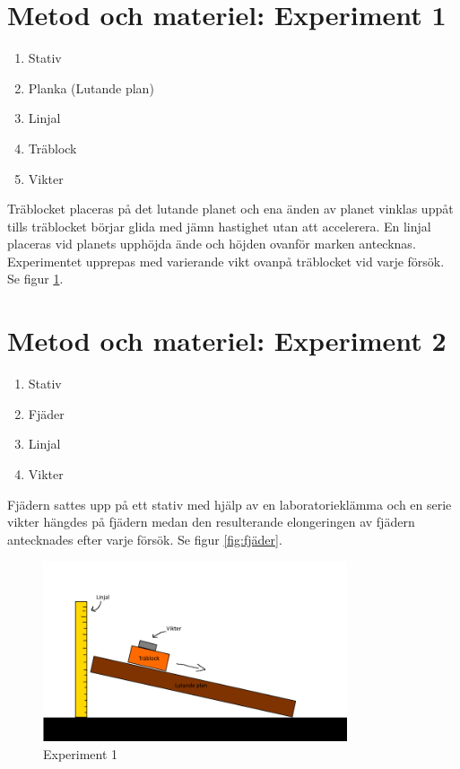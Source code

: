 \documentclass[11p, titlepage, oneside, a4paper]{article}
\begin{document}
	\section{Metod och materiel: Experiment 1}
        \begin{enumerate}
            \item Stativ
            \item Planka (Lutande plan)
            \item Linjal
            \item Träblock
            \item Vikter
        \end{enumerate}

 Träblocket placeras på det lutande planet och ena änden av planet vinklas uppåt tills träblocket börjar glida med jämn hastighet utan att accelerera. En linjal placeras vid planets upphöjda ände och höjden ovanför marken antecknas. Experimentet upprepas med varierande vikt ovanpå träblocket vid varje försök. Se figur \ref{fig:lutandeplan}.

	\section{Metod och materiel: Experiment 2}
        \begin{enumerate}
            \item Stativ
            \item Fjäder
            \item Linjal
            \item Vikter
        \end{enumerate}

Fjädern sattes upp på ett stativ med hjälp av en laboratorieklämma och en serie vikter hängdes på fjädern medan den resulterande elongeringen av fjädern antecknades efter varje försök. Se figur \ref{fig:fjäder}.
        

        
        \begin{figure}[!h]
            \includegraphics[width=0.8\textwidth]{images/lutandeplangrej}
            \caption{Experiment 1}
            \label{fig:lutandeplan}
        \end{figure}
\end{document}
